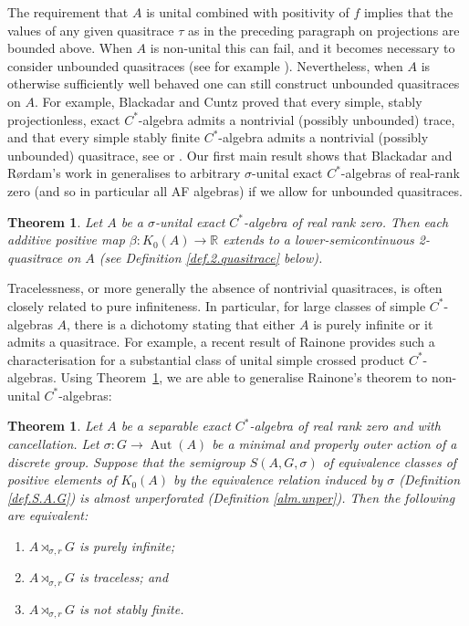 \documentclass[a4paper, 12pt]{amsart}
\numberwithin{equation}{section}
\newcounter{theorem}
\newtheorem{thm}[theorem]{Theorem}
\theoremstyle{remark}
\theoremstyle{definition}
\begin{document}
The requirement that $A$ is unital combined with positivity of $f$ implies that the values
of any given
quasitrace $\tau$ as in the preceding paragraph on projections are bounded above.
When $A$ is non-unital this can fail, and it becomes
necessary to consider unbounded quasitraces (see for example \cite{Kir, MR2032998}).
Nevertheless, when $A$ is otherwise sufficiently well behaved one can still construct
unbounded quasitraces on $A$. For example, Blackadar and Cuntz proved that every simple,
stably projectionless, exact $C^*$-algebra admits a nontrivial (possibly unbounded)
trace, and that every simple stably finite $C^*$-algebra admits a nontrivial (possibly
unbounded) quasitrace, see \cite[Theorem~1.1.5]{MR1878881} or \cite{MR667536}. Our first
main result shows that Blackadar and R{\o}rdam's work in \cite{MR1190414} generalises to
arbitrary $\sigma$-unital exact $C^*$-algebras of real-rank zero (and so in particular
all AF algebras) if we allow for unbounded quasitraces.

\begin{thm}\label{thm1}
Let $A$ be a $\sigma$-unital exact $C^*$-algebra of real rank zero. Then each additive
positive map $\beta \colon K_0(A)\to {\mathbb{R}}$ extends to a lower-semicontinuous 2-quasitrace
on $A$ (see Definition \ref{def.2.quasitrace} below).
\end{thm}

Tracelessness, or more generally the absence of nontrivial quasitraces, is often closely
related to pure infiniteness. In particular, for large classes of simple $C^*$-algebras
$A$, there is a dichotomy stating that either $A$ is purely infinite or it admits a
quasitrace. For example, a recent result of Rainone \cite[Theorem~1.1]{Rai} provides such
a characterisation for a substantial class of unital simple crossed product
$C^*$-algebras. Using Theorem~\ref{thm1}, we are able to generalise Rainone's theorem to
non-unital $C^*$-algebras:
\begin{thm}\label{thm2}
Let $A$ be a separable exact $C^*$-algebra of real rank zero and with cancellation. Let
$\sigma : G \to {\operatorname{Aut}}(A)$ be a minimal and properly outer action of a discrete group.
Suppose that the semigroup $S(A, G, \sigma)$ of equivalence classes of positive elements
of $K_0(A)$ by the equivalence relation induced by $\sigma$ (Definition \ref{def.S.A.G})
is almost unperforated (Definition \ref{alm.unper}). Then the following are equivalent:
\begin{enumerate}
\item $A \rtimes_{\sigma, r} G$ is purely infinite;
\item $A \rtimes_{\sigma, r} G$ is traceless; and
\item $A \rtimes_{\sigma, r} G$ is not stably finite.
\end{enumerate}
\end{thm}
\end{document}
